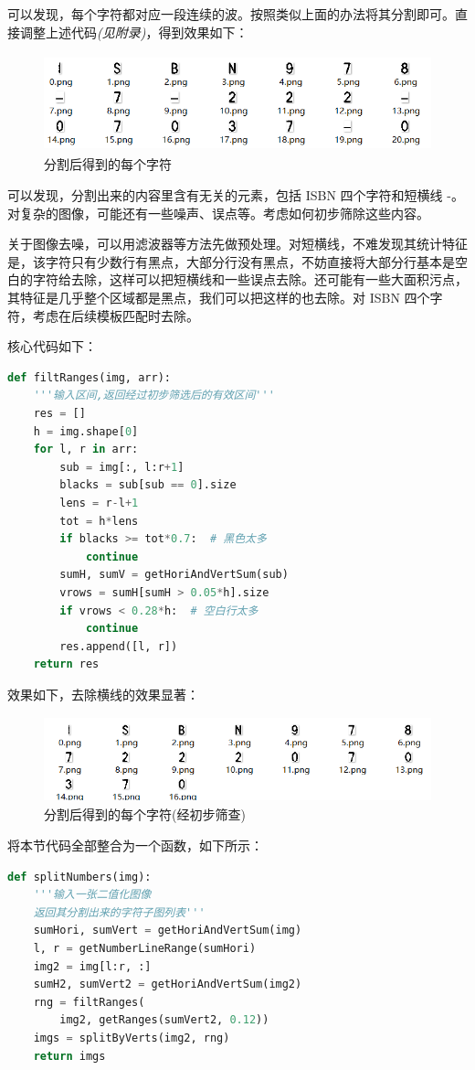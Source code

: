 \documentclass{ctexart}
\begin{document}
可以发现，每个字符都对应一段连续的波。按照类似上面的办法将其分割即可。直接调整上述代码\textit{(见附录)}，得到效果如下：
\begin{figure}[H]
    \centering
    \includegraphics[height=80pt]{sample_splitNum2}
    \caption{分割后得到的每个字符}
\end{figure}

可以发现，分割出来的内容里含有无关的元素，包括 ISBN 四个字符和短横线 -。对复杂的图像，可能还有一些噪声、误点等。考虑如何初步筛除这些内容。

关于图像去噪，可以用滤波器等方法先做预处理。对短横线，不难发现其统计特征是，该字符只有少数行有黑点，大部分行没有黑点，不妨直接将大部分行基本是空白的字符给去除，这样可以把短横线和一些误点去除。还可能有一些大面积污点，其特征是几乎整个区域都是黑点，我们可以把这样的也去除。对 ISBN 四个字符，考虑在后续模板匹配时去除。

核心代码如下：
\begin{lstlisting}[language=python]
def filtRanges(img, arr):
    '''输入区间,返回经过初步筛选后的有效区间'''
    res = []
    h = img.shape[0]
    for l, r in arr:
        sub = img[:, l:r+1]
        blacks = sub[sub == 0].size
        lens = r-l+1
        tot = h*lens
        if blacks >= tot*0.7:  # 黑色太多
            continue
        sumH, sumV = getHoriAndVertSum(sub)
        vrows = sumH[sumH > 0.05*h].size
        if vrows < 0.28*h:  # 空白行太多
            continue
        res.append([l, r])
    return res
\end{lstlisting}

效果如下，去除横线的效果显著：
\begin{figure}[H]
    \centering
    \includegraphics[height=70pt]{sample_splitNum_flit2}
    \caption{分割后得到的每个字符(经初步筛查)}
\end{figure}

将本节代码全部整合为一个函数，如下所示：
\begin{lstlisting}[language=python]
def splitNumbers(img):
    '''输入一张二值化图像
    返回其分割出来的字符子图列表'''
    sumHori, sumVert = getHoriAndVertSum(img)
    l, r = getNumberLineRange(sumHori)
    img2 = img[l:r, :]
    sumH2, sumVert2 = getHoriAndVertSum(img2)
    rng = filtRanges(
        img2, getRanges(sumVert2, 0.12))
    imgs = splitByVerts(img2, rng)
    return imgs
\end{lstlisting}
\end{document}
